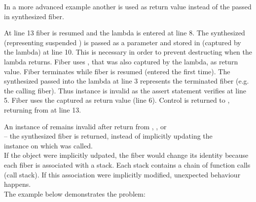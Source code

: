 In a more advanced example another \fiber is used as return value instead of the
passed in synthesized fiber.

At line 13 fiber  is resumed and the lambda is entered at line 8. The
synthesized \fiber\xspace {} (representing suspended \main) is passed as a
parameter  and stored in  (captured by the lambda) at line 10.
This is necessary in order to prevent destructing  when the lambda
returns. Fiber  uses , that was also captured by the lambda, as
return value. Fiber  terminates while fiber  is resumed (entered
the first time). The synthesized \fiber\xspace {} passed into the lambda at line 3
represents the terminated fiber  (e.g. the calling fiber). Thus instance
 is invalid as the assert statement verifies at line 5. Fiber  uses
the captured \fiber\xspace {} as return value (line 6). Control is returned to
\main, returning from  at line 13.\\


\label{fiberreturn}
An instance of \fiber remains invalid after return from \resume, \resumewith,
\xtresume or\\
\xtresumewith -- the synthesized fiber is returned, instead of
implicitly updating the\\\fiber instance on which \resume was called.\\
If the \fiber object were implicitly udpated, the fiber would 
change its identity because each fiber is associated with a stack. Each stack
contains a chain of function calls (call stack). If this association were
implicitly modified, unexpected behaviour happens.\\
The example below demonstrates the problem:

